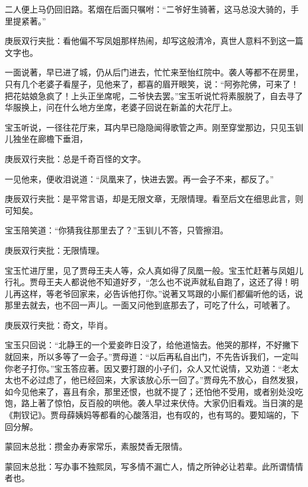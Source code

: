 \begin{parag}


    二人便上马仍回旧路。茗烟在后面只嘱咐：“二爷好生骑著，这马总没大骑的，手里提紧著。”\begin{note}庚辰双行夹批：看他偏不写凤姐那样热闹，却写这般清冷，真世人意料不到这一篇文字也。\end{note}一面说著，早已进了城，仍从后门进去，忙忙来至怡红院中。袭人等都不在房里，只有几个老婆子看屋子，见他来了，都喜的眉开眼笑，说：“阿弥陀佛，可来了！把花姑娘急疯了！上头正坐席呢，二爷快去罢。”宝玉听说忙将素服脱了，自去寻了华服换上，问在什么地方坐席，老婆子回说在新盖的大花厅上。
\end{parag}


\begin{parag}


    宝玉听说，一径往花厅来，耳内早已隐隐闻得歌管之声。刚至穿堂那边，只见玉钏儿独坐在廊檐下垂泪，\begin{note}庚辰双行夹批：总是千奇百怪的文字。\end{note}一见他来，便收泪说道：“凤凰来了，快进去罢。再一会子不来，都反了。”\begin{note}庚辰双行夹批：是平常言语，却是无限文章，无限情理。看至后文在细思此言，则可知矣。\end{note}宝玉陪笑道：“你猜我往那里去了？”玉钏儿不答，只管擦泪。\begin{note}庚辰双行夹批：无限情理。\end{note}宝玉忙进厅里，见了贾母王夫人等，众人真如得了凤凰一般。宝玉忙赶著与凤姐儿行礼。贾母王夫人都说他不知道好歹，“怎么也不说声就私自跑了，这还了得！明儿再这样，等老爷回家来，必告诉他打你。”说著又骂跟的小厮们都偏听他的话，说那里去就去，也不回一声儿。一面又问他到底那去了，可吃了什么，可唬著了。\begin{note}庚辰双行夹批：奇文，毕肖。\end{note}宝玉只回说：“北静王的一个爱妾昨日没了，给他道恼去。他哭的那样，不好撇下就回来，所以多等了一会子。”贾母道：“以后再私自出门，不先告诉我们，一定叫你老子打你。”宝玉答应著。因又要打跟的小子们，众人又忙说情，又劝道：“老太太也不必过虑了，他已经回来，大家该放心乐一回了。”贾母先不放心，自然发狠，如今见他来了，喜且有余，那里还恨，也就不提了；还怕他不受用，或者别处没吃饱，路上著了惊怕，反百般的哄他。袭人早过来伏侍。大家仍旧看戏。当日演的是《荆钗记》。贾母薛姨妈等都看的心酸落泪，也有叹的，也有骂的。要知端的，下回分解。
\end{parag}

\begin{parag}

    \begin{note}蒙回末总批：攒金办寿家常乐，素服焚香无限情。\end{note}
\end{parag}


\begin{parag}


    \begin{note}蒙回末总批：写办事不独熙凤，写多情不漏亡人，情之所钟必让若辈。此所谓情情者也。\end{note}
\end{parag}

